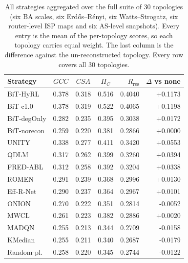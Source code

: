 \begin{table}[!htbp]
\centering
\small
\setlength{\tabcolsep}{4pt}
\caption{All strategies aggregated over the full suite of 30 topologies (six BA scales, six Erd\H{o}s--R\'enyi, six Watts--Strogatz, six router-level ISP maps and six AS-level snapshots). Every entry is the mean of the per-topology scores, so each topology carries equal weight. The last column is the difference against the un-reconstructed topology. Every row covers all 30 topologies.}
\label{tab:aggregate_all}
\begin{tabular}{@{}l *{3}{c} r r@{}}
\toprule
\textbf{Strategy} & \textbf{$GCC$} & \textbf{$CSA$} & \textbf{$H_C$} & \textbf{$R_{\mathrm{res}}$} & \textbf{$\Delta$ vs none} \\
\midrule
BiT-HyRL & 0.378 & 0.318 & 0.516 & 0.4040 & +0.1173 \\
BiT-c1.0 & 0.378 & 0.319 & 0.522 & 0.4065 & +0.1198 \\
BiT-degOnly & 0.282 & 0.235 & 0.395 & 0.3038 & +0.0172 \\
\midrule
BiT-norecon & 0.259 & 0.220 & 0.381 & 0.2866 & +0.0000 \\
\midrule
UNITY & 0.338 & 0.277 & 0.411 & 0.3420 & +0.0553 \\
QDLM & 0.317 & 0.262 & 0.399 & 0.3260 & +0.0394 \\
FRED-ABL & 0.312 & 0.258 & 0.392 & 0.3204 & +0.0338 \\
ROMEN & 0.291 & 0.239 & 0.368 & 0.2996 & +0.0130 \\
Eff-R-Net & 0.290 & 0.237 & 0.364 & 0.2967 & +0.0101 \\
ONION & 0.270 & 0.222 & 0.351 & 0.2814 & -0.0052 \\
MWCL & 0.261 & 0.223 & 0.382 & 0.2886 & +0.0020 \\
MADQN & 0.255 & 0.213 & 0.344 & 0.2709 & -0.0158 \\
KMedian & 0.255 & 0.211 & 0.340 & 0.2687 & -0.0179 \\
Random-pl. & 0.258 & 0.220 & 0.345 & 0.2744 & -0.0122 \\
\bottomrule
\end{tabular}
\end{table}
